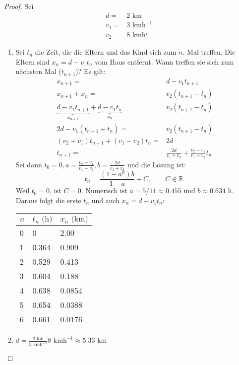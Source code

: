 \documentclass[prb,12pt]{revtex4-2}
\theoremstyle{definition}
\theoremstyle{definition}
\newenvironment{parts}{\begin{enumerate}[label=(\alph*)]}{\end{enumerate}}
\newcommand{\R}{\mathbb{R}}
\begin{document}
\begin{proof}
Sei
\begin{align*}
	d=&2\text{ km}\\
	v_1=&3\text{ kmh}^{-1}\\
	v_2=&8\text{ kmh}^{_1}
\end{align*}
	\begin{parts}
	\item 		Sei $t_n$ die Zeit, die die Eltern und das Kind sich zum $n$. Mal treffen. Die Eltern sind $x_n=d-v_1t_n$ vom Haus entfernt. Wann treffen sie sich zum nächsten Mal ($t_{n+1}$)? Es gilt:
	\begin{align*}
		x_{n+1}=& d-v_1t_{n+1}\\
		x_{n+1}+x_n=& v_2(t_{n+1}-t_n)\\
		\underbrace{d-v_1t_{n+1}}_{x_{n+1}}+\underbrace{d-v_1t_n}_{x_n}=&v_2(t_{n+1}-t_n)\\
		2d-v_1(t_{n+1}+t_n)=& v_2(t_{n+1}-t_n)\\
		(v_2+v_1)t_{n+1}+(v_1-v_2)t_n=&2d\\
		t_{n+1}=&\frac{2d}{v_1+v_2}+\frac{v_2-v_1}{v_1+v_2}t_n
	\end{align*}
	Sei dann $t_0=0,a=\frac{v_2-v_1}{v_1+v_2},b=\frac{2d}{v_1+v_2}$ und die L\"{o}sung ist:
	\[
	t_n=\frac{(1-a^n)b}{1-a}+C, \qquad C\in \R
	.\] 
	Weil $t_0=0$, ist $C=0$. Numerisch ist $a=5 / 11\approx 0.455$ und $b\approx 0.634\text{ h}$. Daraus folgt die erste $t_n$ und auch $x_n=d-v_1t_n$:

	\begin{center}
		\begin{tabular}{p{}p{}p{}}
			\toprule
			$n$ & $t_n\text{ (h)}$ & $x_n\text{ (km)}$\\\midrule
0 & 0 & 2.00 \\\midrule
1 & 0.364 & 0.909 \\\midrule
2 & 0.529 & 0.413 \\\midrule
3 & 0.604 & 0.188 \\\midrule
4 & 0.638 & 0.0854 \\\midrule
5 & 0.654 & 0.0388 \\\midrule
6 & 0.661 & 0.0176 \\\bottomrule
		\end{tabular}
	\end{center}
\item $d=\frac{2\text{ km}}{3\text{ kmh}^{-1}}8\text{ kmh}^{-1}\approx 5.33\text{ km}$
	\end{parts}
\end{proof}
\end{document}
